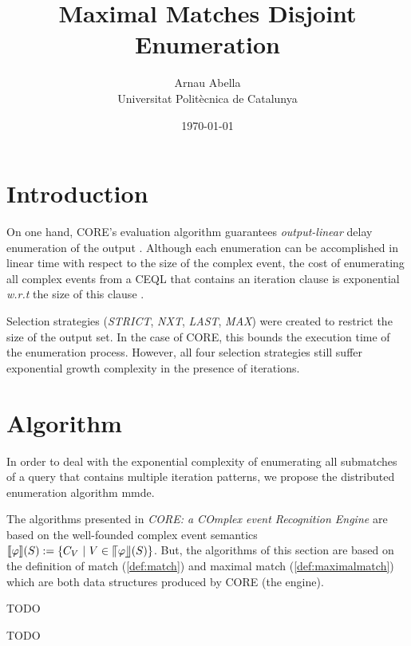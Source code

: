 \documentclass[12pt, a4paper]{article}
\title{%
  \vspace{-10ex}
  Maximal Matches Disjoint Enumeration
}
\author{%
  Arnau Abella \\
  \large{Universitat Polit\`ecnica de Catalunya}
}
\date{\today}
\begin{document}
\maketitle


\section{Introduction}
\label{sec:introduction}

On one hand, CORE's evaluation algorithm guarantees \textit{output-linear} delay enumeration of the output \cite{core}.
Although each enumeration can be accomplished in linear time with respect to the size of the complex event,
the cost of enumerating all complex events from a CEQL that contains an iteration clause is exponential \textit{w.r.t} the size of this clause \cite{grez_et_al:LIPIcs:2019:10307}.

Selection strategies (\textit{STRICT}, \textit{NXT}, \textit{LAST}, \textit{MAX}) were created to restrict the size of the output set.
In the case of CORE, this bounds the execution time of the enumeration process.
However, all four selection strategies still suffer exponential growth complexity in the presence of iterations.

\section{Algorithm}
\label{sec:algorithm}

In order to deal with the exponential complexity of enumerating all submatches of a query that contains multiple iteration patterns, we propose the distributed enumeration algorithm \gls{mmde}.

The algorithms presented in \textit{CORE: a COmplex event Recognition Engine} are based on the well-founded complex event semantics $\llbracket \varphi \rrbracket (S) := \{ C_{V} \ | \ V \in \llceil \varphi \rrfloor (S) \}$. But, the algorithms of this section are based on the definition of match (\ref{def:match}) and maximal match (\ref{def:maximalmatch}) which are both data structures produced by CORE (the engine).

\begin{definition}[Match]
  \label{def:match}
  TODO
\end{definition}

\begin{definition}
  \label{def:maximalmatch}
  TODO
\end{definition}
\end{document}
